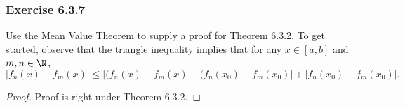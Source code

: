 \subsubsection{Exercise 6.3.7} Use the Mean Value Theorem to supply a proof for Theorem 6.3.2. To get started, observe that the triangle inequality implies that for any \( x \in [a,b]  \) and \( m,n \in \N  \),
\[ | f_n(x) - f_m(x)  |  \leq | (f_n(x) - f_m(x) - (f_n(x_0) - f_m(x_0)  | + | f_n(x_0) -f_m(x_0) |. \]
\begin{proof}
Proof is right under Theorem 6.3.2.
\end{proof}

